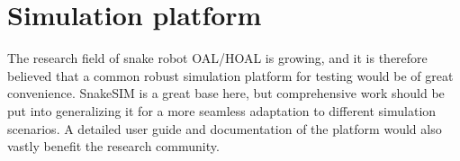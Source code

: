 \section{Simulation platform}

The research field of snake robot OAL/HOAL is growing, and it is therefore believed that a common robust simulation platform for testing would be of great convenience. SnakeSIM is a great base here, but comprehensive work should be put into generalizing it for a more seamless adaptation to different simulation scenarios. A detailed user guide and documentation of the platform would also vastly benefit the research community.